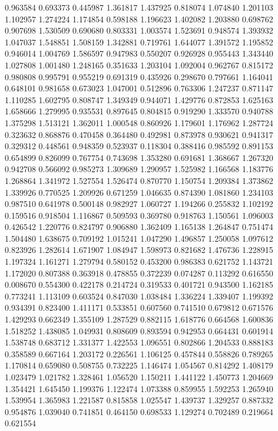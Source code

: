 0.963584
0.693373
0.445987
1.361817
1.437925
0.818074
1.074840
1.201103
1.102957
1.274224
1.174854
0.598188
1.196623
1.402082
1.203880
0.698762
0.907698
1.530509
0.690680
0.803331
1.003574
1.523691
0.948574
1.393932
1.047037
1.548851
1.508159
1.342881
0.719761
1.644077
1.391572
1.195852
0.946014
1.004769
1.586597
0.947983
0.550207
0.926928
0.955443
1.343440
1.027808
1.001480
1.248165
0.351633
1.203104
1.092004
0.962767
0.815172
0.980808
0.995791
0.955219
0.691319
0.435926
0.298670
0.797661
1.164041
0.648101
0.981658
0.673023
1.047001
0.512896
0.763306
1.247237
0.871147
1.110285
1.602795
0.808747
1.349349
0.944071
1.429776
0.872853
1.625163
1.658666
1.279995
0.935531
0.897645
0.804815
0.919290
1.333570
0.940788
1.375298
1.513121
1.362011
1.000548
0.860926
1.179601
1.176962
1.287724
0.323632
0.868876
0.470458
0.364480
0.492981
0.873978
0.930621
0.941317
0.329312
0.448561
0.948359
0.523937
0.118304
0.388416
0.985592
0.891153
0.654899
0.826099
0.767754
0.743698
1.353280
0.691681
1.368667
1.267320
0.942708
0.566092
0.985273
1.309689
1.290957
1.525982
1.166568
1.183776
1.268864
1.341972
1.527554
1.526474
0.870770
1.150754
1.209384
1.373862
1.339926
0.770525
1.209926
0.671259
1.046635
0.874390
1.081860
1.234103
0.987510
0.641978
0.500148
0.982927
1.060727
1.194266
0.255832
1.102192
0.159516
0.918504
1.116867
0.509593
0.369780
0.918763
1.150561
1.096003
0.426542
1.220776
0.824797
0.906880
1.362409
1.165138
1.264847
0.751474
1.504480
1.638675
0.709192
1.015241
1.047290
1.496857
1.250058
1.097612
0.823926
1.282614
1.671907
1.084947
1.598973
0.821682
1.476736
1.228915
1.197324
1.161271
1.279794
0.580152
0.453200
0.986383
0.621752
1.143721
1.172020
0.807388
0.363918
0.478855
0.372239
0.074287
0.113292
0.616550
0.008670
0.554300
0.422178
0.214724
0.319533
0.401721
0.943500
1.162185
0.773241
1.113109
0.603524
0.847030
1.038484
1.336224
1.339407
1.199392
0.934391
0.823400
1.411171
0.533851
0.607560
0.741510
0.679812
0.671576
1.429293
0.662349
1.355109
1.287529
0.882115
1.618776
0.664568
1.600836
1.518252
1.438085
1.049931
0.808609
0.893594
0.942953
0.664431
0.601914
1.538748
0.683712
1.331377
1.422553
1.096551
0.802866
1.204533
0.888183
0.358589
0.667164
1.203172
0.226561
1.106125
0.457844
0.558826
0.789265
1.170814
0.659080
0.508755
0.732225
1.146474
1.054567
0.814292
1.408179
1.023479
1.021782
1.328461
1.056520
1.150211
1.441122
1.450773
1.204669
1.354421
1.645450
1.199376
1.122474
1.073388
0.859955
1.592253
1.265940
1.539954
1.365983
1.221587
0.815858
1.025547
1.439737
1.329257
0.887332
0.954876
1.039040
0.741851
0.464150
0.698533
1.129274
0.702489
0.219664
0.621554
